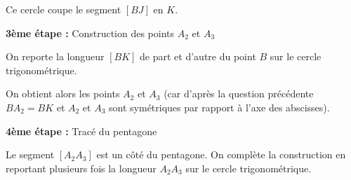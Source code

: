 \begin{corrige}
\begin{enumerate}
     \par
     Ce cercle coupe le segment $[BJ]$ en $K$.
\begin{center}
\end{center}
     \textbf{3ème étape : } Construction des points $A_2$ et $A_3$
     \par
     On reporte la longueur $[BK]$ de part et d'autre du point $B$ sur le cercle trigonométrique.
     \par
     On obtient alors les points $A_2$ et $A_3$ (car d'après la question précédente $BA_2=BK$ et $A_2$ et $A_3$ sont symétriques par rapport à l'axe des abscisses).
\begin{center}
\end{center}
     \textbf{4ème étape : } Tracé du pentagone
     \par
     Le segment $[A_2A_3]$ est un côté du pentagone. On complète la construction en reportant plusieurs fois la longueur $A_2A_3$ sur le cercle trigonométrique.
\begin{center}
\end{center}
\end{enumerate}
\end{corrige}
